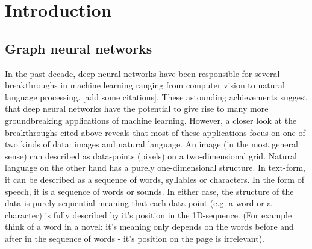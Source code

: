 \chapter{Introduction}
\label{chapter:Introduction}



\section{Graph neural networks}

In the past decade, deep neural networks have been responsible for several breakthroughs in machine learning ranging from computer vision to natural language processing. [add some citations]. These astounding achievements suggest that deep neural networks have the potential to give rise to many more groundbreaking applications of machine learning. However, a closer look at the breakthroughs cited above reveals that most of these applications focus on one of two kinds of data: images and natural language. An image (in the most general sense) can described as data-points (pixels) on a two-dimensional grid. Natural language on the other hand has a purely one-dimensional structure. In text-form, it can be described as a sequence of words, syllables or characters. In the form of speech, it is a sequence of words or sounds. In either case, the structure of the data is purely sequential meaning that each data point (e.g. a word or a character) is fully described by it's position in the 1D-sequence. (For example think of a word in a novel: it's meaning only depends on the words before and after in the sequence of words - it's position on the page is irrelevant).

